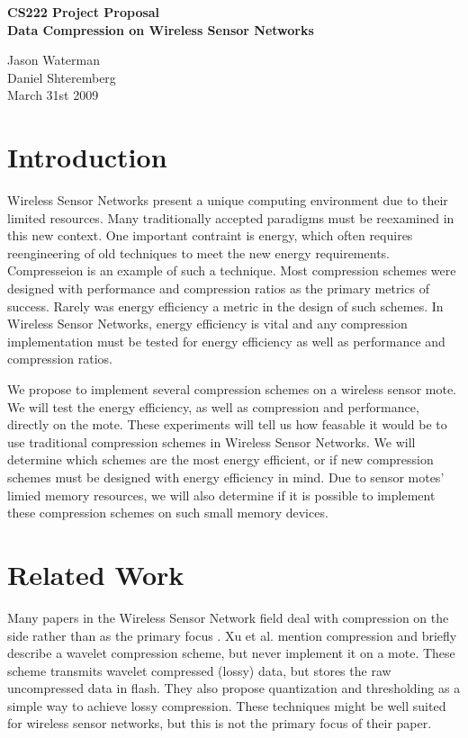 \documentclass[10pt]{article}
\begin{document}
\begin{center}
\Large\textbf{CS222 Project Proposal \\ Data Compression on Wireless Sensor Networks}

\bigskip

Jason Waterman \\ Daniel Shteremberg \\
\medskip
March 31st 2009
\end{center}

\section{Introduction}

Wireless Sensor Networks present a unique computing environment due to
their limited resources. Many traditionally accepted paradigms must be
reexamined in this new context. One important contraint is energy,
which often requires reengineering of old techniques to meet the new
energy requirements. Compresseion is an example of such a
technique. Most compression schemes were designed with performance and
compression ratios as the primary metrics of success. Rarely was
energy efficiency a metric in the design of such schemes. In Wireless
Sensor Networks, energy efficiency is vital and any compression
implementation must be tested for energy efficiency as well as
performance and compression ratios. 

We propose to implement several compression schemes on a wireless
sensor mote. We will test the energy efficiency, as well as
compression and performance, directly on the mote. These experiments
will tell us how feasable it would be to use traditional compression
schemes in Wireless Sensor Networks. We will determine which schemes
are the most energy efficient, or if new compression schemes must be
designed with energy efficiency in mind. Due to sensor motes' limied
memory resources, we will also determine if it is possible to
implement these compression schemes on such small memory devices. 

\section{Related Work}

Many papers in the Wireless Sensor Network field deal with compression
on the side rather than as the primary focus
\cite{habitat}\cite{structural}. Xu et al. \cite{structural} mention
compression and briefly describe a wavelet compression scheme, but
never implement it on a mote. These scheme transmits wavelet
compressed (lossy) data, but stores the raw uncompressed data in
flash. They also propose quantization and thresholding as a simple way
to achieve lossy compression. These techniques might be well suited
for wireless sensor networks, but this is not the primary focus of
their paper.
\end{document}
